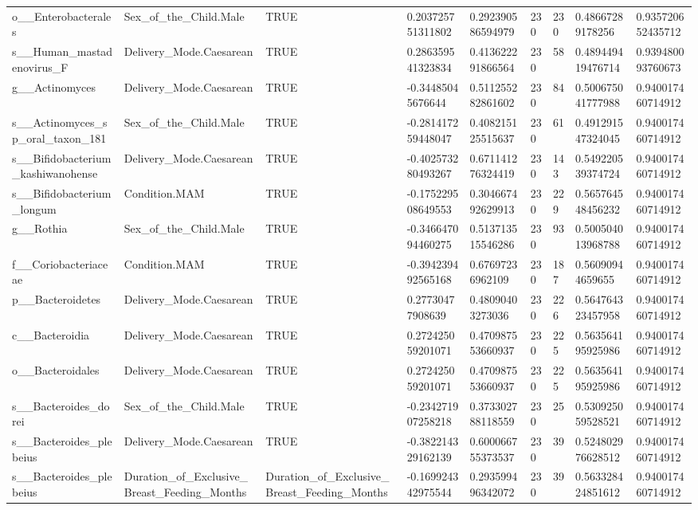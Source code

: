 \begin{longtable}{lllllllll}
o\_\_Enterobacterales & Sex\_of\_the\_Child.Male & TRUE & 0.203725751311802 & 0.292390586594979 & 230 & 230 & 0.48667289178256 & 0.935720652435712 \\
s\_\_Human\_mastadenovirus\_F & Delivery\_Mode.Caesarean & TRUE & 0.286359541323834 & 0.413622291866564 & 230 & 58 & 0.489449419476714 & 0.939480093760673 \\
g\_\_Actinomyces & Delivery\_Mode.Caesarean & TRUE & -0.34485045676644 & 0.511255282861602 & 230 & 84 & 0.500675041777988 & 0.940017460714912 \\
s\_\_Actinomyces\_sp\_oral\_taxon\_181 & Sex\_of\_the\_Child.Male & TRUE & -0.281417259448047 & 0.408215125515637 & 230 & 61 & 0.491291547324045 & 0.940017460714912 \\
s\_\_Bifidobacterium\_kashiwanohense & Delivery\_Mode.Caesarean & TRUE & -0.402573280493267 & 0.671141276324419 & 230 & 143 & 0.549220539374724 & 0.940017460714912 \\
s\_\_Bifidobacterium\_longum & Condition.MAM & TRUE & -0.175229508649553 & 0.304667492629913 & 230 & 229 & 0.565764548456232 & 0.940017460714912 \\
g\_\_Rothia & Sex\_of\_the\_Child.Male & TRUE & -0.346647094460275 & 0.513713515546286 & 230 & 93 & 0.500504013968788 & 0.940017460714912 \\
f\_\_Coriobacteriaceae & Condition.MAM & TRUE & -0.394239492565168 & 0.67697236962109 & 230 & 187 & 0.56090944659655 & 0.940017460714912 \\
p\_\_Bacteroidetes & Delivery\_Mode.Caesarean & TRUE & 0.27730477908639 & 0.48090403273036 & 230 & 226 & 0.564764323457958 & 0.940017460714912 \\
c\_\_Bacteroidia & Delivery\_Mode.Caesarean & TRUE & 0.272425059201071 & 0.470987553660937 & 230 & 225 & 0.563564195925986 & 0.940017460714912 \\
o\_\_Bacteroidales & Delivery\_Mode.Caesarean & TRUE & 0.272425059201071 & 0.470987553660937 & 230 & 225 & 0.563564195925986 & 0.940017460714912 \\
s\_\_Bacteroides\_dorei & Sex\_of\_the\_Child.Male & TRUE & -0.234271907258218 & 0.373302788118559 & 230 & 25 & 0.530925059528521 & 0.940017460714912 \\
s\_\_Bacteroides\_plebeius & Delivery\_Mode.Caesarean & TRUE & -0.382214329162139 & 0.600066755373537 & 230 & 39 & 0.524802976628512 & 0.940017460714912 \\
s\_\_Bacteroides\_plebeius & Duration\_of\_Exclusive\_Breast\_Feeding\_Months & Duration\_of\_Exclusive\_Breast\_Feeding\_Months & -0.169924342975544 & 0.293599496342072 & 230 & 39 & 0.563328424851612 & 0.940017460714912 \\

\end{longtable}
